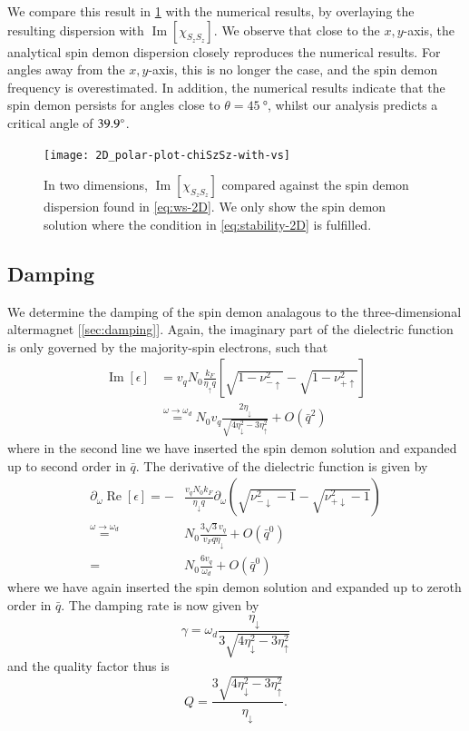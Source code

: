 \documentclass[aps,prb,reprint,twocolumns,superscriptaddress,nofootinbib]{revtex4-2}
\DeclareMathOperator{\Imm}{Im}
\DeclareMathOperator{\Ree}{Re}
\newcommand{\kF}{k_{F}}
\begin{document}
	We compare this result in \cref{fig:compare2D} with the numerical results, by overlaying the resulting dispersion with $\Imm[\chi_{S_zS_z}]$. We observe that close to the $x,y$-axis, the analytical spin demon dispersion closely reproduces the numerical results. For angles away from the $x,y$-axis, this is no longer the case, and the spin demon frequency is overestimated. In addition, the numerical results indicate that the spin demon persists for angles close to $\theta=\SI{45}{\degree}$, whilst our analysis predicts a critical angle of $\SI{39.9}{\degree}$. 
	\begin{figure}
		\texttt{[image: 2D\_polar-plot-chiSzSz-with-vs]}
		\caption{In two dimensions, $\Imm[\chi_{S_zS_z}]$ compared against the spin demon dispersion found in \cref{eq:ws-2D}. We only show the spin demon solution where the condition in \cref{eq:stability-2D} is fulfilled.  \label{fig:compare2D} }
	\end{figure}
	
	
		
	\subsection{Damping}
	We determine the damping of the spin demon analagous to the three-dimensional altermagnet [\cref{sec:damping}]. Again, the imaginary part of the dielectric function is only governed by the majority-spin electrons, such that 
	\begin{align}
		\Imm[\epsilon] &= v_q N_0 \frac{\kF}{\eta_\uparrow q} \left[\sqrt{1-\nu_{-\uparrow}^2}-\sqrt{1-\nu_{+\uparrow}^2}\right] \\
		&\overset{\omega\rightarrow\omega_{d}}{=}N_0v_q\frac{2\eta_\downarrow}{\sqrt{4\eta_\downarrow^2-3\eta_\uparrow^2}}+ O(\bar q^2)
	\end{align}
	where in the second line we have inserted the spin demon solution and expanded up to second order in $\bar q$.
	The derivative of the dielectric function is given by
	\begin{align}
		\partial_\omega \Ree[\epsilon] = -&\frac{v_q N_0 \kF}{\eta_\downarrow q} \partial_\omega \left(\sqrt{\nu_{-\downarrow}^2-1}-\sqrt{\nu_{+\downarrow}^2-1}\right) \\ 
		\overset{\omega\rightarrow\omega_{d}}{=}&N_0\frac{3\sqrt{3} v_q}{v_F q\eta_\downarrow} + O(\bar q^0)\\
		=&N_0\frac{6v_q}{\omega_{d}}+ O(\bar q^0)
	\end{align}
	where we have again inserted the spin demon solution and expanded up to zeroth order in $\bar q$.
	The damping rate is now given by
	\begin{equation}
		\gamma = \omega_{d}\frac{\eta_\downarrow}{3\sqrt{4\eta_\downarrow^2-3\eta_\uparrow^2}}
	\end{equation}
	and the quality factor thus is
	\begin{equation}
		Q = \frac{3\sqrt{4\eta_\downarrow^2-3\eta_\uparrow^2}}{\eta_\downarrow}.
	\end{equation}
	
\end{document}
